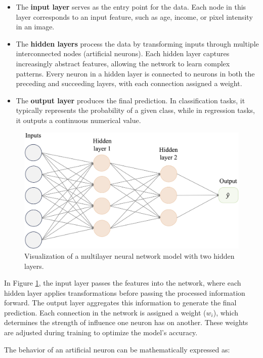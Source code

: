 \documentclass[
]{book}
\theoremstyle{definition}
\theoremstyle{definition}
\theoremstyle{definition}
\theoremstyle{definition}
\theoremstyle{remark}
\begin{document}
\begin{itemize}
\item
  The \textbf{input layer} serves as the entry point for the data. Each node in this layer corresponds to an input feature, such as age, income, or pixel intensity in an image.
\item
  The \textbf{hidden layers} process the data by transforming inputs through multiple interconnected nodes (artificial neurons). Each hidden layer captures increasingly abstract features, allowing the network to learn complex patterns. Every neuron in a hidden layer is connected to neurons in both the preceding and succeeding layers, with each connection assigned a weight.
\item
  The \textbf{output layer} produces the final prediction. In classification tasks, it typically represents the probability of a given class, while in regression tasks, it outputs a continuous numerical value.
\end{itemize}

\begin{figure}

{\centering \includegraphics[width=0.8\linewidth]{images/ch12_net_large} 

}

\caption{Visualization of a multilayer neural network model with two hidden layers.}\label{fig:net-large}
\end{figure}

In Figure \ref{fig:net-large}, the input layer passes the features into the network, where each hidden layer applies transformations before passing the processed information forward. The output layer aggregates this information to generate the final prediction. Each connection in the network is assigned a weight (\(w_i\)), which determines the strength of influence one neuron has on another. These weights are adjusted during training to optimize the model's accuracy.

The behavior of an artificial neuron can be mathematically expressed as:
\end{document}

